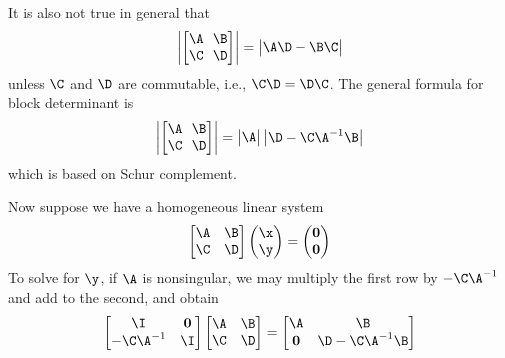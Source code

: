 It is also not true in general that
\begin{align*}
    \begin{vmatrix}\left[\begin{matrix}\A ~~ \B \\ \C ~~  \D\end{matrix}\right]\end{vmatrix} = \begin{vmatrix}\A\D-\B\C\end{vmatrix}
\end{align*}
unless $\C$ and $\D$ are commutable, i.e., $\C\D = \D\C$. The general formula for block determinant is
\begin{align}
    \begin{vmatrix}\left[\begin{matrix}\A ~~ \B \\ \C ~~  \D\end{matrix}\right]\end{vmatrix} = \begin{vmatrix}\A\end{vmatrix}\begin{vmatrix}\D - \C\A^{-1}\B\end{vmatrix}
\end{align}
which is based on Schur complement.

Now suppose we have a homogeneous linear system
\begin{align}
	\left[\begin{matrix}\A & \B \\ \C & \D \end{matrix}\right] \left(\begin{matrix} \x \\ \y \end{matrix}\right) = \left(\begin{matrix} \mathbf{0} \\ \mathbf{0} \end{matrix}\right)
\end{align}
To solve for $\y$, if $\A$ is nonsingular, we may multiply the first row by $-\C\A^{-1}$ and add to the second, and obtain
\begin{align}\label{eq:shurA}
	\left[\begin{matrix}\I & \mathbf{0} \\ -\C\A^{-1} & \I \end{matrix}\right] \left[\begin{matrix}\A & \B \\ \C & \D \end{matrix}\right] = \left[\begin{matrix}\A & \B \\ \mathbf{0} & \D-\C\A^{-1}\B \end{matrix}\right]	
\end{align}

